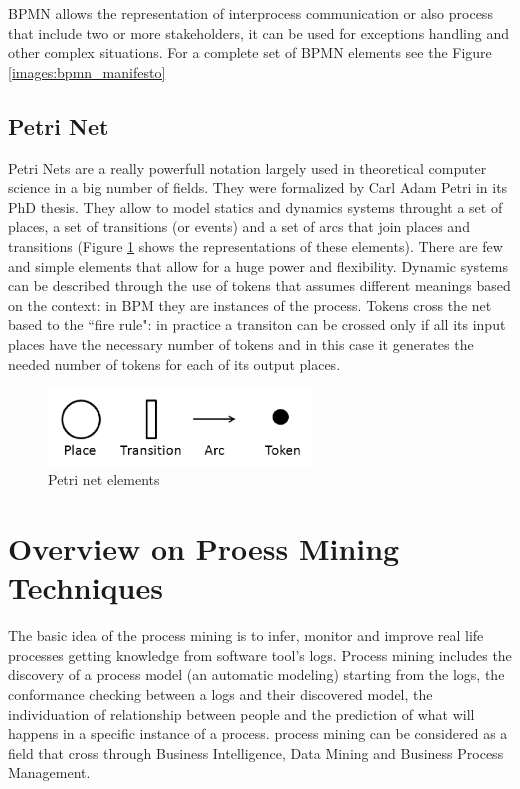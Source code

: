 BPMN allows the representation of interprocess communication or also process that include two or more stakeholders, it can 
be used for exceptions handling and other complex situations. For a complete set of BPMN elements see the Figure 
\ref{images:bpmn_manifesto}


\subsection{Petri Net}
Petri Nets are a really powerfull notation largely used in theoretical computer science in a big number of fields. They were 
formalized by Carl Adam Petri in its PhD thesis. They allow to model statics and dynamics systems throught a set of places, 
a set of transitions (or events) and a set of arcs that join places and transitions (Figure \ref{images:petri_net_elements} 
shows the representations of these elements). There are few and simple elements that allow for a huge power and flexibility. 
Dynamic systems can be described through the use of tokens that assumes different meanings based on the context: in BPM they 
are instances of the process. Tokens cross the net based to the ``fire rule": in practice a transiton can be crossed only if 
all its input places have the necessary number of tokens and in this case it generates the needed number of tokens for each 
of its output places.

\begin{figure}[!ht]
    \centering
\includegraphics[width=70mm]{images/petri_net_elements.jpg}
    \caption{Petri net elements}
    \label{images:petri_net_elements}
\end{figure}

\section{Overview on Proess Mining Techniques}
\label{process_mining:overview}
The basic idea of the process mining is to infer, monitor and improve real life processes getting knowledge from 
software tool's logs.
Process mining includes the discovery of a process model (an automatic modeling) starting from the logs, the 
conformance checking between a logs and their discovered model, the individuation of relationship between people 
and the prediction of what will happens in a specific instance of a process.
process mining can be considered as a field that cross through Business Intelligence, Data Mining and Business 
Process Management.

